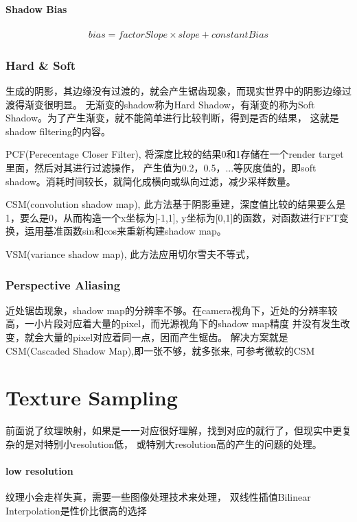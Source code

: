 \paragraph{Shadow Bias}

\begin{gather*}
    bias = factorSlope \times slope + constantBias
\end{gather*}

\subsubsection{Hard \& Soft}

生成的阴影，其边缘没有过渡的，就会产生锯齿现象，而现实世界中的阴影边缘过渡得渐变很明显。
无渐变的shadow称为Hard Shadow，有渐变的称为Soft Shadow。为了产生渐变，就不能简单进行比较判断，得到是否的结果，
这就是shadow filtering的内容。

PCF(Perecentage Closer Filter), 将深度比较的结果0和1存储在一个render target里面，然后对其进行过滤操作，
产生值为0.2，0.5，...等灰度值的，即soft shadow。消耗时间较长，就简化成横向或纵向过滤，减少采样数量。

CSM(convolution shadow map), 此方法基于阴影重建，深度值比较的结果要么是1，要么是0，从而构造一个x坐标为[-1,1],
y坐标为[0,1]的函数，对函数进行FFT变换，运用基准函数sin和cos来重新构建shadow map。 

VSM(variance shadow map), 此方法应用切尔雪夫不等式，

\subsubsection{Perspective Aliasing}

近处锯齿现象，shadow map的分辨率不够。在camera视角下，近处的分辨率较高，一小片段对应着大量的pixel，而光源视角下的shadow map精度
并没有发生改变，就会大量的pixel对应着同一点，因而产生锯齿。 解决方案就是CSM(Cascaded Shadow Map),即一张不够，就多张来,
可参考微软的CSM\cite{CSM-msdn}

\section{Texture Sampling}

前面说了纹理映射，如果是一一对应很好理解，找到对应的就行了，但现实中更复杂的是对特别小resolution低，
或特别大resolution高的产生的问题的处理。


\paragraph{low resolution}
纹理小会走样失真，需要一些图像处理技术来处理，
双线性插值Bilinear Interpolation是性价比很高的选择

